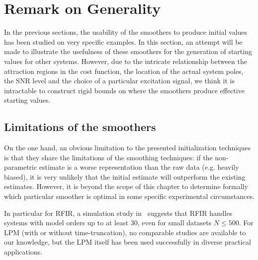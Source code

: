 \section{Remark on Generality}
\label{se:Generality}
In the previous sections, the usability of the smoothers to produce initial values has been studied on very specific examples.
In this section, an attempt will be made to illustrate the usefulness of these smoothers for the generation of starting values for other systems.
However, due to the intricate relationship between the attraction regions in the cost function, the location of the actual system poles, the \gls{SNR} level and the choice of a particular excitation signal, we think it is intractable to construct rigid bounds on where the smoothers produce effective starting values.

\subsection{Limitations of the smoothers}
On the one hand, an obvious limitation to the presented initialization techniques is that they share the limitations of the smoothing techniques: if the non-parametric estimate is a worse representation than the raw data (e.g. heavily biased), it is very unlikely that the initial estimate will outperform the existing estimates.
However, it is beyond the scope of this chapter to determine formally which particular smoother is optimal in some specific experimental circumstances.

In particular for RFIR, a simulation study in~\citep{Chen2013} suggests that RFIR handles systems with model orders up to at least $30$, even for small datasets $N\leq 500$.
For LPM (with or without time-truncation), no comparable studies are available to our knowledge, but the LPM itself has been used successfully in diverse practical applications.

